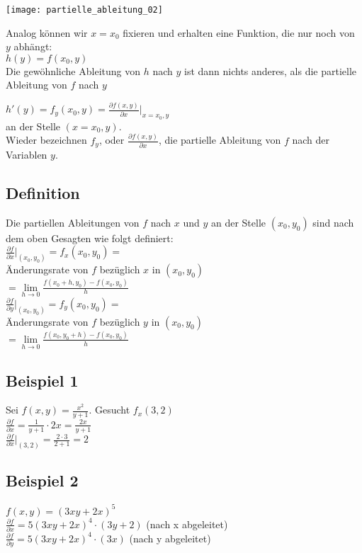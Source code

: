 \documentclass[../main.tex]{subfiles}
\begin{document}
\begin{minipage}{0.45\textwidth}
    \texttt{[image: partielle\_ableitung\_02]}
\end{minipage} \hfill
\begin{minipage}{0.5\textwidth}
    Analog können wir $x=x_0$ fixieren und erhalten eine Funktion, die nur noch von $y$ abhängt: \\ [7pt]
    $h(y)=f(x_0,y)$ \\ [7pt]
    Die gewöhnliche Ableitung von $h$ nach $y$ ist dann nichts anderes, als die partielle Ableitung von $f$ nach $y$ 
\end{minipage}
$h'(y)=f_y(x_0,y)=\frac{\partial f(x,y)}{\partial x}|_{x=x_0,y}$ \\ [7pt]
an der Stelle $(x=x_0,y)$. \\
Wieder bezeichnen $f_y$, oder $\frac{\partial f(x,y)}{\partial x}$, die partielle Ableitung von $f$ nach der Variablen $y$.

\subsection{Definition}
Die partiellen Ableitungen von $f$ nach $x$ und $y$ an der Stelle $(x_0,y_0)$ sind nach dem oben Gesagten
wie folgt definiert: \\ [7pt]
$\frac{\partial f}{\partial x}|_{(x_0,y_0)}=f_x(x_0,y_0)=$ \\ [7pt]
Änderungsrate von $f$ bezüglich $x$ in $(x_0,y_0)$ \\ [7pt]
$ =\lim\limits_{h\to 0}\frac{f(x_0+h,y_0)-f(x_0,y_0)}{h}$ \\ [7pt]
$\frac{\partial f}{\partial y}|_{(x_0,y_0)}=f_y(x_0,y_0)=$ \\ [7pt]
Änderungsrate von $f$ bezüglich $y$ in $(x_0,y_0)$ \\ [7pt]
$ =\lim\limits_{h\to 0}\frac{f(x_0,y_0+h)-f(x_0,y_0)}{h}$

\subsection{Beispiel 1}
Sei $f(x,y)=\frac{x^2}{y+1}$. Gesucht $f_x(3,2)$ \\ [7pt]
$\frac{\partial f}{\partial x}=\frac{1}{y+1}\cdot 2x = \frac{2x}{y+1}$ \\ [7pt]
$\frac{\partial f}{\partial x}|_{(3,2)} = \frac{2\cdot 3}{2+1}=2$

\subsection{Beispiel 2}
$f(x,y)=(3xy+2x)^5$ \\ [7pt]
$\frac{\partial f}{\partial x}=5(3xy+2x)^4\cdot (3y+2)$ (nach x abgeleitet)\\ [7pt]
$\frac{\partial f}{\partial y}=5(3xy+2x)^4\cdot (3x)$ (nach y abgeleitet)
\end{document}
